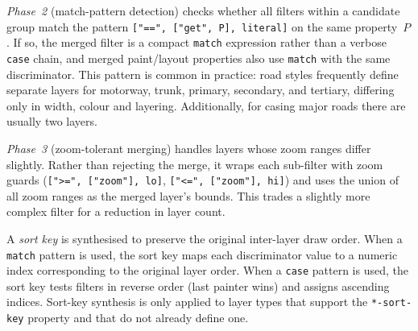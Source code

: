 \emph{Phase~2} (match-pattern detection) checks whether all filters within a candidate group match the pattern \texttt{["==",~["get",~P],~literal]} on the same property~$P$.
If so, the merged filter is a compact \texttt{match} expression rather than a verbose \texttt{case} chain, and merged paint/layout properties also use \texttt{match} with the same discriminator.
This pattern is common in practice: road styles frequently define separate layers for motorway, trunk, primary, secondary, and tertiary, differing only in width, colour and layering.
Additionally, for casing major roads there are usually two layers.

\emph{Phase~3} (zoom-tolerant merging) handles layers whose zoom ranges differ slightly.
Rather than rejecting the merge, it wraps each sub-filter with zoom guards (\texttt{[">=",\allowbreak~["zoom"],\allowbreak~lo]}, \texttt{["<=",\allowbreak~["zoom"],\allowbreak~hi]}) and uses the union of all zoom ranges as the merged layer's bounds.
This trades a slightly more complex filter for a reduction in layer count.

A \emph{sort key} is synthesised to preserve the original inter-layer draw order.
When a \texttt{match} pattern is used, the sort key maps each discriminator value to a numeric index corresponding to the original layer order.
When a \texttt{case} pattern is used, the sort key tests filters in reverse order (last painter wins) and assigns ascending indices.
Sort-key synthesis is only applied to layer types that support the \texttt{*-sort-key} property and that do not already define one.

